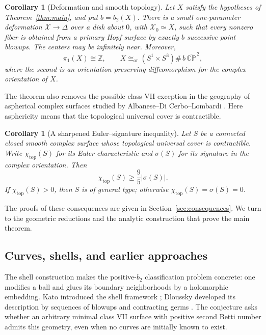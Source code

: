 \documentclass[11pt]{article}
\numberwithin{equation}{section}
\newtheorem{corollary}[theorem]{Corollary}
\theoremstyle{definition}
\theoremstyle{remark}
\newcommand{\ZZ}{\mathbb Z}
\begin{document}
\begin{corollary}[Deformation and smooth topology]\label{cor:topology}
Let $X$ satisfy the hypotheses of Theorem~\ref{thm:main}, and put
$b=b_2(X)$. There is a small one-parameter deformation
$\mathcal X\to\Delta$ over a disk about $0$, with $\mathcal X_0\simeq X$,
such that every nonzero fiber is obtained from a primary Hopf surface by
exactly $b$ successive point blowups. The centers may be infinitely near.
Moreover,
\[
 \pi_1(X)\cong\ZZ,\qquad
 X\cong_{\mathrm{or}}(S^1\times S^3)\#\,b\,\overline{\mathbb{CP}}^{\,2},
\]
where the second is an orientation-preserving diffeomorphism for the
complex orientation of $X$.
\end{corollary}

The theorem also removes the possible class VII exception in the
geography of aspherical complex surfaces studied by
Albanese--Di Cerbo--Lombardi \cite{AlbaneseDiCerboLombardi2025}.
Here asphericity means that the topological universal cover is
contractible.

\begin{corollary}[A sharpened Euler--signature inequality]
\label{cor:aspherical-geography}
Let $S$ be a connected closed smooth complex surface whose topological
universal cover is contractible. Write $\chi_{\mathrm{top}}(S)$ for its
Euler characteristic and $\sigma(S)$ for its signature in the complex
orientation. Then
\[
 \chi_{\mathrm{top}}(S)\geq\frac95|\sigma(S)|.
\]
If $\chi_{\mathrm{top}}(S)>0$, then $S$ is of general type; otherwise
$\chi_{\mathrm{top}}(S)=\sigma(S)=0$.
\end{corollary}

The proofs of these consequences are given in
Section~\ref{sec:consequences}. We turn to the geometric reductions and
the analytic construction that prove the main theorem.

\subsection*{Curves, shells, and earlier approaches}

The shell construction makes the positive-$b_2$ classification problem
concrete: one modifies a ball and glues its boundary neighborhoods by a
holomorphic embedding. Kato introduced the shell framework
\cite{Kato1977}; Dloussky developed its description by sequences of
blowups and contracting germs \cite{Dloussky1984}. The conjecture asks
whether an arbitrary minimal class VII surface with positive second
Betti number admits this geometry, even when no curves are initially
known to exist.
\end{document}

